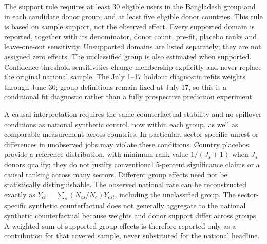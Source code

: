 The support rule requires at least 30 eligible users in the Bangladesh group and in each candidate donor group, and at least five eligible donor countries. This rule is based on sample support, not the observed effect. Every supported domain is reported, together with its denominator, donor count, pre-fit, placebo ranks and leave-one-out sensitivity. Unsupported domains are listed separately; they are not assigned zero effects. The unclassified group is also estimated when supported. Confidence-threshold sensitivities change membership explicitly and never replace the original national sample. The July 1--17 holdout diagnostic refits weights through June 30; group definitions remain fixed at July 17, so this is a conditional fit diagnostic rather than a fully prospective prediction experiment.

A causal interpretation requires the same counterfactual stability and no-spillover conditions as national synthetic control, now within each group, as well as comparable measurement across countries. In particular, sector-specific unrest or differences in unobserved jobs may violate these conditions. Country placebos provide a reference distribution, with minimum rank value $1/(J_s+1)$ when $J_s$ donors qualify; they do not justify conventional 5-percent significance claims or a causal ranking across many sectors. Different group effects need not be statistically distinguishable. The observed national rate can be reconstructed exactly as $Y_{ct}=\sum_s(N_{cs}/N_c)Y_{cst}$, including the unclassified group. The sector-specific synthetic counterfactual does not generally aggregate to the national synthetic counterfactual because weights and donor support differ across groups. A weighted sum of supported group effects is therefore reported only as a contribution for that covered sample, never substituted for the national headline.
